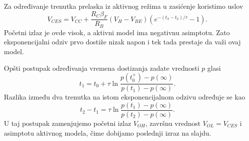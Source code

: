 Za određivanje trenutka prelaska iz aktivnog režima u zasićenje koristimo uslov
\[V_{CES}=V_{CC}+\frac{R_C\beta_F}{R_B}(V_H-V_{BE})(e^{-(t_3-t_2)/\tau}-1).\]
Početni izlaz je ovde visok, a aktivni model ima negativnu asimptotu. Zato eksponencijalni odziv prvo dostiže nizak napon i tek tada prestaje da važi ovaj model.

Opšti postupak određivanja vremena dostizanja zadate vrednosti $p$ glasi
\[t_1=t_0+\tau\ln\frac{p(t_0^+)-p(\infty)}{p(t_1)-p(\infty)}.\]
Razlika između dva trenutka na istom eksponencijalnom odzivu određuje se kao
\[t_2-t_1=\tau\ln\frac{p(t_1)-p(\infty)}{p(t_2)-p(\infty)}.\]
U taj postupak zamenjujemo početni izlaz $V_{OH}$, završnu vrednost $V_{OL}=V_{CES}$ i asimptotu aktivnog modela, čime dobijamo poslednji izraz na slajdu.

